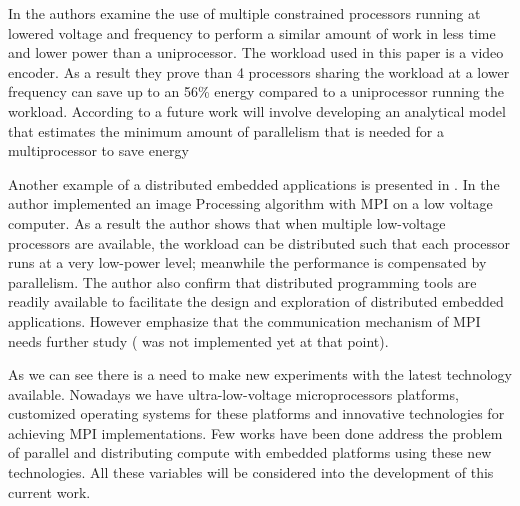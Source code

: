 In \cite{Weglarz} the authors examine the use of multiple constrained
processors running at lowered voltage and frequency to perform a similar amount
of work in less time and lower power than a uniprocessor.  The workload used in
this paper is a video encoder. As a result they prove than 4 processors sharing
the workload at a lower frequency can save up to an 56\% energy compared to a
uniprocessor running the workload. According to \cite{Weglarz} a future work
will involve developing an analytical model that estimates the minimum amount
of parallelism that is needed for a multiprocessor to save energy

Another example of a distributed embedded applications is presented in
\cite{Liu}. In \cite{Liu} the author implemented an image Processing algorithm
with MPI on a low voltage computer. As a result the author shows that when
multiple low-voltage processors are available, the workload can be distributed
such that each processor runs at a very low-power level; meanwhile the
performance is compensated by parallelism. The author also confirm that
distributed programming tools are readily available to facilitate the design
and exploration of distributed embedded applications. However emphasize that
the communication mechanism of MPI needs further study ( \cite{Abgaria} was not
implemented yet at that point). 

As we can see there is a need to make new experiments with the latest
technology available. Nowadays we have ultra-low-voltage microprocessors
platforms, customized operating systems for these platforms and  innovative
technologies for achieving MPI implementations. Few works \cite{Victor-Marcos}
\cite{Victor-Marcos-elc} have been done address the problem of parallel and
distributing compute with embedded platforms using these new technologies. All
these variables will be considered into the development of this current work.

\newpage

\clearpage
